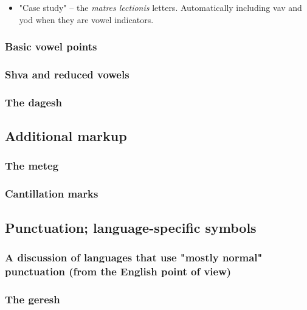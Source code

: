\documentclass[11pt]{article}
\begin{document}
\begin{itemize}
\item "Case study" -- the \emph{matres lectionis} letters. Automatically including vav and yod when they are vowel indicators.
\end{itemize}

\subsubsection{Basic vowel points}
\label{sec:org50a7765}

\subsubsection{Shva and reduced vowels}
\label{sec:orgf24dad5}

\subsubsection{The dagesh}
\label{sec:orgd62e02d}

\subsection{Additional markup}
\label{sec:org0cf003c}

\subsubsection{The meteg}
\label{sec:orge5b01e1}

\subsubsection{Cantillation marks}
\label{sec:org1b35cdf}

\subsection{Punctuation; language-specific symbols}
\label{sec:org7834746}

\subsubsection{A discussion of languages that use "mostly normal" punctuation (from the English point of view)}
\label{sec:org8e81b46}

\subsubsection{The geresh}
\label{sec:orgafabd1f}
\end{document}
